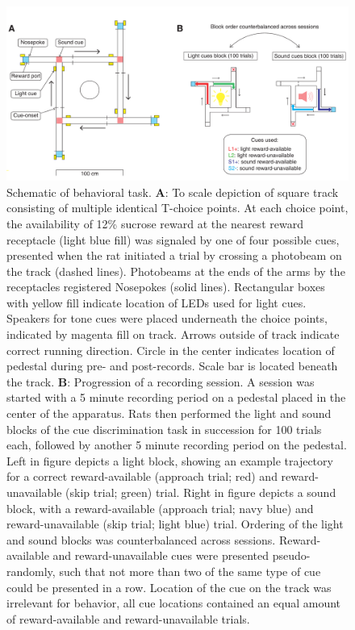 \documentclass[11pt]{article}
\newcommand{\bsf}[1]{\textbf{#1}}
\begin{document}
 \begin{figure}[ht!]
\centering
\includegraphics[width=\textwidth]{Fig 2 - Schematic task.pdf}
\caption{Schematic of behavioral task. \bsf{A}: To scale depiction of
  square track consisting of multiple identical T-choice points. At
  each choice point, the availability of 12\% sucrose reward at the
  nearest reward receptacle (light blue fill) was signaled by one of
  four possible cues, presented when the rat initiated a trial by
  crossing a photobeam on the track (dashed lines). Photobeams at the
  ends of the arms by the receptacles registered Nosepokes (solid
  lines). Rectangular boxes with yellow fill indicate location of LEDs
  used for light cues. Speakers for tone cues were placed underneath
  the choice points, indicated by magenta fill on track. Arrows
  outside of track indicate correct running direction. Circle in the
  center indicates location of pedestal during pre- and
  post-records. Scale bar is located beneath the track. \bsf{B}:
  Progression of a recording session. A session was started with a 5
  minute recording period on a pedestal placed in the center of the
  apparatus. Rats then performed the light and sound blocks of the cue
  discrimination task in succession for 100 trials each, followed by
  another 5 minute recording period on the pedestal. Left in figure
  depicts a light block, showing an example trajectory for a correct
  reward-available (approach trial; red) and reward-unavailable (skip
  trial; green) trial. Right in figure depicts a sound block, with a
  reward-available (approach trial; navy blue) and reward-unavailable
  (skip trial; light blue) trial. Ordering of the light and sound
  blocks was counterbalanced across sessions. Reward-available and
  reward-unavailable cues were presented pseudo-randomly, such that
  not more than two of the same type of cue could be presented in a
  row. Location of the cue on the track was irrelevant for behavior,
  all cue locations contained an equal amount of reward-available and
  reward-unavailable trials.}
\label{fig:task}
\end{figure} \clearpage
\end{document}
